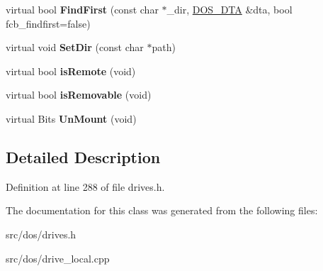 \begin{DoxyCompactItemize}
\item 
\hypertarget{classcdromDrive_afd0347b272659c24f6f3cd9b7b05f89c}{virtual bool {\bfseries Find\-First} (const char $\ast$\-\_\-dir, \hyperlink{classDOS__DTA}{D\-O\-S\-\_\-\-D\-T\-A} \&dta, bool fcb\-\_\-findfirst=false)}\label{classcdromDrive_afd0347b272659c24f6f3cd9b7b05f89c}

\item 
\hypertarget{classcdromDrive_a3aeeb35dbd5100a4b973aa6341295521}{virtual void {\bfseries Set\-Dir} (const char $\ast$path)}\label{classcdromDrive_a3aeeb35dbd5100a4b973aa6341295521}

\item 
\hypertarget{classcdromDrive_a2186d681041aad9456c57cd4be5cc0bc}{virtual bool {\bfseries is\-Remote} (void)}\label{classcdromDrive_a2186d681041aad9456c57cd4be5cc0bc}

\item 
\hypertarget{classcdromDrive_ab96402d6d61617f26d545268e1127a07}{virtual bool {\bfseries is\-Removable} (void)}\label{classcdromDrive_ab96402d6d61617f26d545268e1127a07}

\item 
\hypertarget{classcdromDrive_a4e5d16dc2a6171b622ed815b464f1114}{virtual Bits {\bfseries Un\-Mount} (void)}\label{classcdromDrive_a4e5d16dc2a6171b622ed815b464f1114}

\end{DoxyCompactItemize}


\subsection{Detailed Description}


Definition at line 288 of file drives.\-h.



The documentation for this class was generated from the following files\-:\begin{DoxyCompactItemize}
\item 
src/dos/drives.\-h\item 
src/dos/drive\-\_\-local.\-cpp\end{DoxyCompactItemize}
